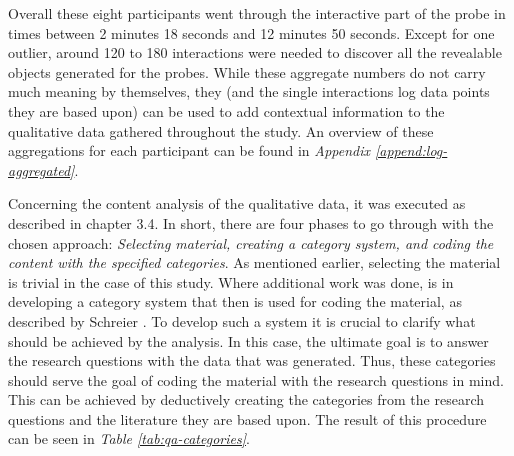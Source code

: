 Overall these eight participants went through the interactive part of the probe in times between 2 minutes 18 seconds and 12 minutes 50 seconds. Except for one outlier, around 120 to 180 interactions were needed to discover all the revealable objects generated for the probes. While these aggregate numbers do not carry much meaning by themselves, they (and the single interactions log data points they are based upon) can be used to add contextual information to the qualitative data gathered throughout the study. An overview of these aggregations for each participant can be found in \textit{Appendix \ref{append:log-aggregated}}.

Concerning the content analysis of the qualitative data, it was executed as described in chapter 3.4. In short, there are four phases to go through with the chosen approach: \textit{Selecting material, creating a category system, and coding the content with the specified categories}. As mentioned earlier, selecting the material is trivial in the case of this study. Where additional work was done, is in developing a category system that then is used for coding the material, as described by Schreier \cite[p. 174]{schreier2014ways}. To develop such a system it is crucial to clarify what should be achieved by the analysis. In this case, the ultimate goal is to answer the research questions with the data that was generated. Thus, these categories should serve the goal of coding the material with the research questions in mind. This can be achieved by deductively creating the categories from the research questions and the literature they are based upon. The result of this procedure can be seen in \textit{Table \ref{tab:qa-categories}}.

